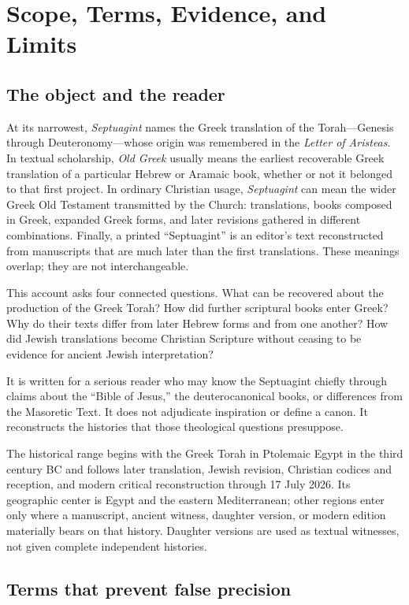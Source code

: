 \section{Scope, Terms, Evidence, and Limits}

\subsection{The object and the reader}

At its narrowest, \emph{Septuagint} names the Greek translation of the Torah---Genesis through Deuteronomy---whose origin was remembered in the \emph{Letter of Aristeas}. In textual scholarship, \emph{Old Greek} usually means the earliest recoverable Greek translation of a particular Hebrew or Aramaic book, whether or not it belonged to that first project. In ordinary Christian usage, \emph{Septuagint} can mean the wider Greek Old Testament transmitted by the Church: translations, books composed in Greek, expanded Greek forms, and later revisions gathered in different combinations. Finally, a printed “Septuagint” is an editor's text reconstructed from manuscripts that are much later than the first translations. These meanings overlap; they are not interchangeable.

This account asks four connected questions. What can be recovered about the production of the Greek Torah? How did further scriptural books enter Greek? Why do their texts differ from later Hebrew forms and from one another? How did Jewish translations become Christian Scripture without ceasing to be evidence for ancient Jewish interpretation?

It is written for a serious reader who may know the Septuagint chiefly through claims about the “Bible of Jesus,” the deuterocanonical books, or differences from the Masoretic Text. It does not adjudicate inspiration or define a canon. It reconstructs the histories that those theological questions presuppose.

The historical range begins with the Greek Torah in Ptolemaic Egypt in the third century BC and follows later translation, Jewish revision, Christian codices and reception, and modern critical reconstruction through 17 July 2026. Its geographic center is Egypt and the eastern Mediterranean; other regions enter only where a manuscript, ancient witness, daughter version, or modern edition materially bears on that history. Daughter versions are used as textual witnesses, not given complete independent histories.

\subsection{Terms that prevent false precision}

